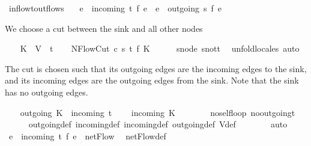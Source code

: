 \begin{isabellebody}
\ inflow{\isacharunderscore}t{\isacharunderscore}outflow{\isacharunderscore}s{\isacharcolon}\ \isanewline
\ \ {\isachardoublequoteopen}{\isacharparenleft}{\isasymSum}e\ {\isasymin}\ incoming\ t{\isachardot}\ f\ e{\isacharparenright}\ {\isacharequal}\ {\isacharparenleft}{\isasymSum}e\ {\isasymin}\ outgoing\ s{\isachardot}\ f\ e{\isacharparenright}{\isachardoublequoteclose}\isanewline
%
\isadelimproof
%
\endisadelimproof
%
\isatagproof
{}\isamarkupfalse%
\ {\isacharminus}%
\begin{isamarkuptxt}%
We choose a cut between the sink and all other nodes%
\end{isamarkuptxt}\isamarkuptrue%
\ \ \isamarkupfalse%
\ {\isacharquery}K\ {\isacharequal}\ {\isachardoublequoteopen}V\ {\isacharminus}\ {\isacharbraceleft}t{\isacharbraceright}{\isachardoublequoteclose}\isanewline
\ \ \isamarkupfalse%
\ NFlowCut\ c\ s\ t\ f\ {\isacharquery}K\isanewline
\ \ \ \ \isamarkupfalse%
\ s{\isacharunderscore}node\ s{\isacharunderscore}not{\isacharunderscore}t\ \isamarkupfalse%
\ unfold{\isacharunderscore}locales\ auto%
\begin{isamarkuptxt}%
The cut is chosen such that its outgoing edges are the incoming edges
    to the sink, and its incoming edges are the outgoing edges from the sink.
    Note that the sink has no outgoing edges.%
\end{isamarkuptxt}\isamarkuptrue%
\ \ \isamarkupfalse%
\ {\isachardoublequoteopen}outgoing{\isacharprime}\ {\isacharquery}K\ {\isacharequal}\ incoming\ t{\isachardoublequoteclose}\isanewline
\ \ \ \ {\isachardoublequoteopen}incoming{\isacharprime}\ {\isacharquery}K\ {\isacharequal}\ {\isacharbraceleft}{\isacharbraceright}{\isachardoublequoteclose}\isanewline
\ \ \ \ \isamarkupfalse%
\ no{\isacharunderscore}self{\isacharunderscore}loop\ no{\isacharunderscore}outgoing{\isacharunderscore}t\isanewline
\ \ \ \ \isamarkupfalse%
\ outgoing{\isacharprime}{\isacharunderscore}def\ incoming{\isacharunderscore}def\ incoming{\isacharprime}{\isacharunderscore}def\ outgoing{\isacharunderscore}def\ V{\isacharunderscore}def\ \ \isanewline
\ \ \ \ \isamarkupfalse%
\ auto\isanewline
\ \ \isamarkupfalse%
\ {\isachardoublequoteopen}{\isacharparenleft}{\isasymSum}e\ {\isasymin}\ incoming\ t{\isachardot}\ f\ e{\isacharparenright}\ {\isacharequal}\ netFlow{\isachardoublequoteclose}\ \isamarkupfalse%
\ netFlow{\isacharunderscore}def\ \isamarkupfalse%

\end{isabellebody}
